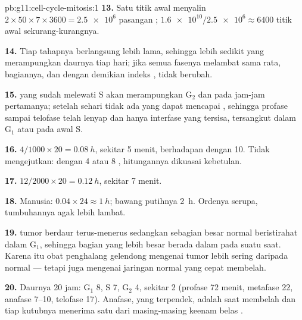\begin{solution}{pb:g11:cell-cycle-mitosis:1}
\textbf{13.} Satu titik awal menyalin $2 \times 50 \times 7 \times 3600 =
\num{2.5e6}$ pasangan ; $\num{1.6e10}/\num{2.5e6} \approx 6400$
titik awal sekurang-kurangnya.

\textbf{14.} Tiap tahapnya berlangsung lebih lama, sehingga lebih
sedikit  yang merampungkan daurnya tiap hari; jika semua fasenya
melambat sama rata, bagiannya, dan dengan demikian indeks ,
tidak berubah.

\textbf{15.}  yang sudah melewati S akan merampungkan
$\mathrm{G_2}$ dan  pada jam-jam pertamanya; setelah sehari
tidak ada  yang dapat mencapai , sehingga profase sampai
telofase telah lenyap dan hanya  interfase yang tersisa, tersangkut
dalam $\mathrm{G_1}$ atau pada awal S.

\textbf{16.} $4/1000 \times 20 = \qty{0.08}{h}$, sekitar 5 menit,
berhadapan dengan 10. Tidak mengejutkan: dengan 4 atau 8 ,
hitungannya dikuasai kebetulan.

\textbf{17.} $12/2000 \times 20 = \qty{0.12}{h}$, sekitar 7 menit.

\textbf{18.} Manusia: $0.04 \times 24 \approx \qty{1}{h}$; bawang
putihnya \qty{2}{h}. Ordenya serupa,  tumbuhannya agak lebih lambat.

\textbf{19.}  tumor berdaur terus-menerus sedangkan sebagian besar
 normal beristirahat dalam $\mathrm{G_1}$, sehingga bagian yang lebih
besar berada dalam  pada suatu saat. Karena itu obat penghalang
gelendong mengenai  tumor lebih sering daripada  normal ---
tetapi juga mengenai jaringan normal yang cepat membelah.

\textbf{20.} Daurnya 20 jam: $\mathrm{G_1}$ 8, S 7, $\mathrm{G_2}$ 4,
 sekitar 2 (profase 72 menit, metafase 22, anafase 7--10,
telofase 17). Anafase, yang terpendek, adalah saat 
membelah dan tiap kutubnya menerima satu  dari masing-masing
keenam belas .
\end{solution}
